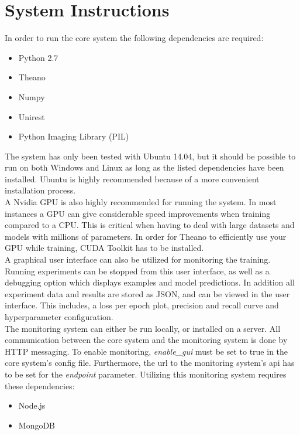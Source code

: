 \section{System Instructions}
\label{app:system_instructions}
In order to run the core system the following dependencies are required:
\begin{itemize}
\item Python 2.7
\item Theano
\item Numpy
\item Unirest
\item Python Imaging Library (PIL)
\end{itemize}

The system has only been tested with Ubuntu 14.04, but it should be possible to run on both Windows and Linux as long as the listed dependencies have been installed. Ubuntu is highly recommended because of a more convenient installation process. \\

A Nvidia GPU is also highly recommended for running the system. In most instances a GPU can give considerable speed improvements when training compared to a CPU. This is critical when having to deal with large datasets and models with millions of parameters. In order for Theano to efficiently use your GPU while training, CUDA Toolkit has to be installed. \\

A graphical user interface can also be utilized for monitoring the training. Running experiments can be stopped from this user interface, as well as a debugging option which displays examples and model predictions. In addition all experiment data and results are stored as JSON, and can be viewed in the user interface. This includes, a loss per epoch plot, precision and recall curve and hyperparameter configuration. \\

The monitoring system can either be run locally, or installed on a server. All communication between the core system and the monitoring system is done by HTTP messaging. To enable monitoring, {\it enable\_gui} must be set to true in the core system's config file. Furthermore, the url to the monitoring system's api has to be set for the {\it endpoint} parameter. Utilizing this monitoring system requires these dependencies:
\begin{itemize}
\item Node.js
\item MongoDB
\end{itemize}

